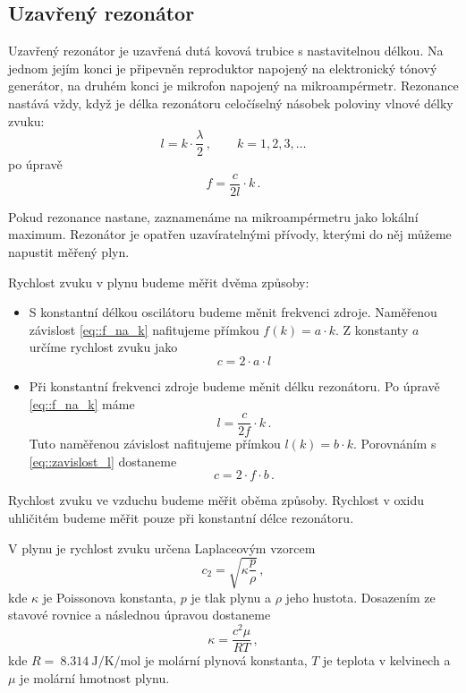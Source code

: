 \subsection*{Uzavřený rezonátor}
Uzavřený rezonátor je uzavřená dutá kovová trubice s nastavitelnou délkou.
Na jednom jejím konci je připevněn reproduktor napojený na elektronický tónový generátor, na druhém konci je mikrofon napojený na mikroampérmetr.
Rezonance nastává vždy, když je délka rezonátoru celočíselný násobek poloviny vlnové délky zvuku:
\begin{equation} \label{eq::l_na_k}
l=k \cdot \frac{\lambda}{2} \,,  \qquad  k=1, 2, 3, \ldots
\end{equation}
po úpravě
\begin{equation} \label{eq::f_na_k}
f=\frac{c}{2l} \cdot k \,.
\end{equation}

Pokud rezonance nastane, zaznamenáme na mikroampérmetru jako lokální maximum.
Rezonátor je opatřen uzavíratelnými přívody, kterými do něj můžeme napustit měřený plyn.

Rychlost zvuku v plynu budeme měřit dvěma způsoby:
\begin{itemize}
\item S konstantní délkou oscilátoru budeme měnit frekvenci zdroje. Naměřenou závislost \eqref{eq::f_na_k} nafitujeme přímkou $f(k) = a \cdot k$. Z konstanty $a$ určíme rychlost zvuku jako
\begin{equation} \label{eq::cza}
c = 2 \cdot a \cdot l
\end{equation}
\item Při konstantní frekvenci zdroje budeme měnit délku rezonátoru. Po úpravě \eqref{eq::f_na_k} máme
\begin{equation} \label{eq::zavislost_l}
l= \frac{c}{2f} \cdot k  \,.
\end{equation}
Tuto naměřenou závislost nafitujeme přímkou $l(k)= b \cdot k$. Porovnáním s \eqref{eq::zavislost_l} dostaneme
\begin{equation} \label{eq::czb}
c = 2 \cdot f \cdot b \,.
\end{equation}
\end{itemize}

Rychlost zvuku ve vzduchu budeme měřit oběma způsoby.
Rychlost v oxidu uhličitém budeme měřit pouze při konstantní délce rezonátoru.

V plynu je rychlost zvuku určena Laplaceovým vzorcem \cite{ZFP}
\begin{equation}
c_2 = \sqrt{\kappa \frac{p}{\rho}} \,,
\end{equation}
kde $\kappa$ je Poissonova konstanta, $p$ je tlak plynu a $\rho$ jeho hustota.
Dosazením ze stavové rovnice a následnou úpravou dostaneme
\begin{equation} \label{eq::kappa}
\kappa = \frac{c^2 \mu}{RT} \,,
\end{equation}
kde $R=~\SI{8.314}{\joule\per\kelvin\per\mole}$ je molární plynová konstanta, $T$ je teplota v kelvinech a $\mu$ je molární hmotnost plynu.

